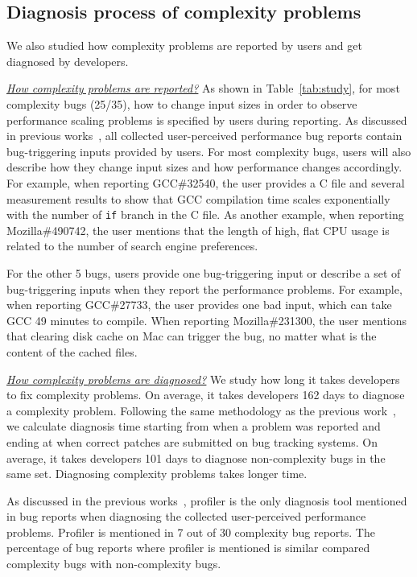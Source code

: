 \subsection{Diagnosis process of complexity problems}
\label{sec:process}

We also studied how complexity problems are reported by users and get diagnosed by developers. 

{\underline{\textit{How complexity problems are reported?}}
As shown in Table~\ref{tab:study},
for most complexity bugs (25/35), 
how to change input sizes in order to observe performance scaling problems 
is specified by users during reporting. 
As discussed in previous works~\cite{SongOOPSLA2014}, 
all collected user-perceived performance bug reports
contain bug-triggering inputs provided by users. 
For most complexity bugs, 
users will also describe how they change input sizes 
and how performance changes accordingly. 
For example, when reporting GCC\#32540, 
the user provides a C file and several measurement results to 
show that GCC compilation time scales exponentially 
with the number of \texttt{if} branch in the C file. 
As another example, when reporting Mozilla\#490742, 
the user mentions that the length of high, 
flat CPU usage is related to the number of search engine preferences. 

For the other 5 bugs, users provide one bug-triggering input 
or describe a set of bug-triggering inputs when they report the performance problems. 
For example, when reporting GCC\#27733, 
the user provides one bad input, which can take GCC 49 minutes to compile. 
When reporting Mozilla\#231300, the user mentions that clearing disk cache on Mac can trigger the bug, 
no matter what is the content of the cached files. 

{\underline{\textit{How complexity problems are diagnosed?}}
We study how long it takes developers to fix complexity problems. 
On average, it takes developers 162 days to diagnose a complexity problem. 
Following the same methodology as the previous work~\cite{SongOOPSLA2014},
we calculate diagnosis time starting from when a problem was reported 
and ending at when correct patches are submitted on bug tracking systems. 
On average, it takes developers 101 days to diagnose non-complexity bugs in the same set. 
Diagnosing complexity problems takes longer time. 


As discussed in the previous works~\cite{SongOOPSLA2014}, 
profiler is the only diagnosis tool mentioned in bug reports 
when diagnosing the collected user-perceived performance problems. 
Profiler is mentioned in 7 out of 30 complexity bug reports. 
The percentage of bug reports where profiler is mentioned 
is similar compared complexity bugs with non-complexity bugs. 


}}
